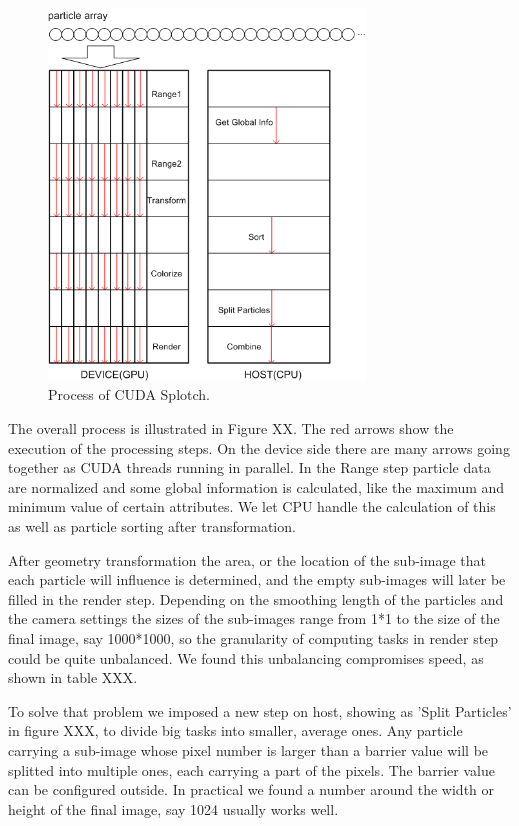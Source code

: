 \begin{figure}
\begin{center}
\includegraphics[width=0.75\textwidth]{cu_splotch_process.png}
\end{center}
\caption{Process of CUDA Splotch.}
\end{figure}

The overall process is illustrated in Figure XX. The red arrows show the execution of the processing steps. On the device side there are 
many arrows going together as CUDA threads running in parallel. In the
 Range step particle data are normalized and some global information is calculated, 
 like the maximum and minimum value of certain attributes. We let CPU handle
  the calculation of this as well as particle sorting after transformation.

After geometry transformation the area, or the location of the sub-image that each 
particle will influence is determined, and the empty sub-images will later be filled 
in the render step. Depending on the smoothing length of the particles and the 
camera settings the sizes of the sub-images range from 1*1 to the size of the 
final image, say 1000*1000, so the granularity of computing tasks in render step 
could be quite unbalanced. We found this unbalancing compromises speed, as shown in table XXX.

To solve that problem we imposed a new step on host, showing as 'Split Particles' 
in figure XXX, to divide big tasks into smaller, average ones. Any particle
carrying a sub-image whose pixel number is larger than a barrier value will be 
splitted into multiple ones, each carrying a part of the pixels. The barrier value 
can be configured outside. In practical we found a number around the width 
or height of the final image, say 1024 usually works well.

